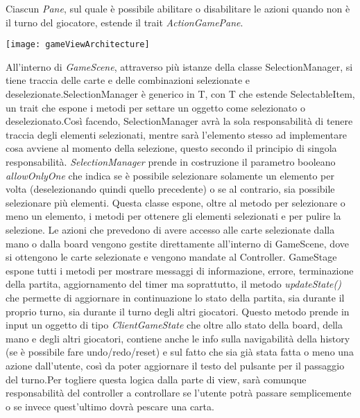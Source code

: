 Ciascun \textit{Pane}, sul quale è possibile abilitare o disabilitare le azioni quando non è il turno del giocatore, estende il trait \textit{ActionGamePane}.
\newline
\begin{center}
    \texttt{[image: gameViewArchitecture]}
\end{center}
All’interno di \textit{GameScene}, attraverso più istanze della classe SelectionManager, si tiene traccia delle carte e delle combinazioni selezionate e deselezionate.\newline SelectionManager è generico in T, con T che estende SelectableItem, un trait che espone i metodi per settare un oggetto come selezionato o deselezionato.\newline Così facendo, SelectionManager avrà la sola responsabilità di tenere traccia degli elementi selezionati, mentre sarà l’elemento stesso ad implementare cosa avviene al momento della selezione, questo secondo il principio di singola responsabilità. \newline \newline
\textit{SelectionManager} prende in costruzione il parametro booleano \textit{allowOnlyOne} che indica se è possibile selezionare solamente un elemento per volta (deselezionando quindi quello precedente) o se al contrario, sia possibile selezionare più elementi. \newline Questa classe espone, oltre al metodo per selezionare o meno un elemento, i metodi per ottenere gli elementi selezionati e per pulire la selezione. \newline \newline
Le azioni che prevedono di avere accesso alle carte selezionate dalla mano o dalla board vengono gestite direttamente all’interno di GameScene, dove si ottengono le carte selezionate e vengono mandate al Controller. \newline \newline
GameStage espone tutti i metodi per mostrare messaggi di informazione, errore, terminazione della partita, aggiornamento del timer ma soprattutto, il metodo \textit{updateState()} che permette di aggiornare in continuazione lo stato della partita, sia durante il proprio turno, sia durante il turno degli altri giocatori.
\newline \newline
Questo metodo prende in input un oggetto di tipo \textit{ClientGameState} che oltre allo stato della board, della mano e degli altri giocatori, contiene anche le info sulla navigabilità della history (se è possibile fare undo/redo/reset) e sul fatto che sia già stata fatta o meno una azione dall’utente, così da poter aggiornare il testo del pulsante per il passaggio del turno.\newline Per togliere questa logica dalla parte di view, sarà comunque responsabilità del controller a controllare se l’utente potrà passare semplicemente o se invece quest’ultimo dovrà pescare una carta.
